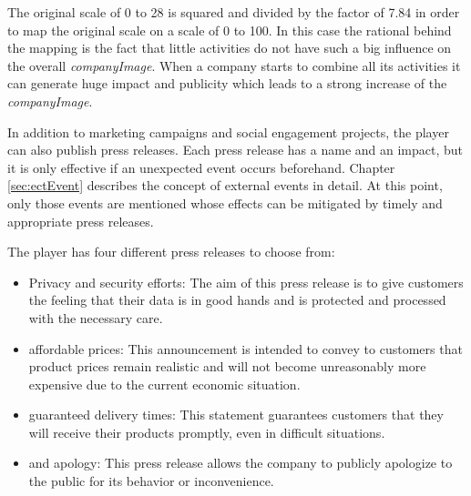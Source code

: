 The original scale of 0 to 28 is squared and divided by the factor of 7.84 in order to map the original scale on a scale of 0 to 100. In this case the rational behind the mapping is the fact that little activities do not have such  a big influence on the overall \textit{companyImage}. When a company starts to combine all its activities it can generate huge impact and publicity which leads to a strong increase of the \textit{companyImage}.

In addition to marketing campaigns and social engagement projects, the player can also publish press releases. Each press release has a name and an impact, but it is only effective if an unexpected event occurs beforehand.  Chapter \ref{sec:ectEvent} describes the concept of external events in detail. At this point, only those events are mentioned whose effects can be mitigated by timely and appropriate press releases.

The player has four different press releases to choose from: 
\begin{itemize}
    \item Privacy and security efforts: The aim of this press release is to give customers the feeling that their data is in good hands and is protected and processed with the necessary care.  
    \item affordable prices: This announcement is intended to convey to customers that product prices remain realistic and will not become unreasonably more expensive due to the current economic situation. 
    \item guaranteed delivery times: This statement guarantees customers that they will receive their products promptly, even in difficult situations. 
    \item and apology: This press release allows the company to publicly apologize to the public for its behavior or inconvenience.
\end{itemize}